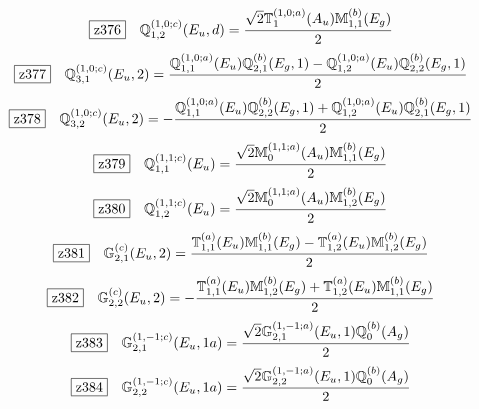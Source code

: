 \documentclass[fleqn,10pt,landscape]{jsarticle}
\begin{document}
\begin{dmath*}
\hspace*{3mm}\fbox{z376}\quad \mathbb{Q}_{1,2}^{(1,0;c)}(E_{u},d)=\frac{\sqrt{2} \mathbb{T}_{1}^{(1,0;a)}(A_{u}) \mathbb{M}_{1,1}^{(b)}(E_{g})}{2}
\end{dmath*}
\begin{dmath*}
\hspace*{3mm}\fbox{z377}\quad \mathbb{Q}_{3,1}^{(1,0;c)}(E_{u},2)=\frac{\mathbb{Q}_{1,1}^{(1,0;a)}(E_{u}) \mathbb{Q}_{2,1}^{(b)}(E_{g},1) - \mathbb{Q}_{1,2}^{(1,0;a)}(E_{u}) \mathbb{Q}_{2,2}^{(b)}(E_{g},1)}{2}
\end{dmath*}
\begin{dmath*}
\hspace*{3mm}\fbox{z378}\quad \mathbb{Q}_{3,2}^{(1,0;c)}(E_{u},2)=- \frac{\mathbb{Q}_{1,1}^{(1,0;a)}(E_{u}) \mathbb{Q}_{2,2}^{(b)}(E_{g},1) + \mathbb{Q}_{1,2}^{(1,0;a)}(E_{u}) \mathbb{Q}_{2,1}^{(b)}(E_{g},1)}{2}
\end{dmath*}
\begin{dmath*}
\hspace*{3mm}\fbox{z379}\quad \mathbb{Q}_{1,1}^{(1,1;c)}(E_{u})=\frac{\sqrt{2} \mathbb{M}_{0}^{(1,1;a)}(A_{u}) \mathbb{M}_{1,1}^{(b)}(E_{g})}{2}
\end{dmath*}
\begin{dmath*}
\hspace*{3mm}\fbox{z380}\quad \mathbb{Q}_{1,2}^{(1,1;c)}(E_{u})=\frac{\sqrt{2} \mathbb{M}_{0}^{(1,1;a)}(A_{u}) \mathbb{M}_{1,2}^{(b)}(E_{g})}{2}
\end{dmath*}
\begin{dmath*}
\hspace*{3mm}\fbox{z381}\quad \mathbb{G}_{2,1}^{(c)}(E_{u},2)=\frac{\mathbb{T}_{1,1}^{(a)}(E_{u}) \mathbb{M}_{1,1}^{(b)}(E_{g}) - \mathbb{T}_{1,2}^{(a)}(E_{u}) \mathbb{M}_{1,2}^{(b)}(E_{g})}{2}
\end{dmath*}
\begin{dmath*}
\hspace*{3mm}\fbox{z382}\quad \mathbb{G}_{2,2}^{(c)}(E_{u},2)=- \frac{\mathbb{T}_{1,1}^{(a)}(E_{u}) \mathbb{M}_{1,2}^{(b)}(E_{g}) + \mathbb{T}_{1,2}^{(a)}(E_{u}) \mathbb{M}_{1,1}^{(b)}(E_{g})}{2}
\end{dmath*}
\begin{dmath*}
\hspace*{3mm}\fbox{z383}\quad \mathbb{G}_{2,1}^{(1,-1;c)}(E_{u},1a)=\frac{\sqrt{2} \mathbb{G}_{2,1}^{(1,-1;a)}(E_{u},1) \mathbb{Q}_{0}^{(b)}(A_{g})}{2}
\end{dmath*}
\begin{dmath*}
\hspace*{3mm}\fbox{z384}\quad \mathbb{G}_{2,2}^{(1,-1;c)}(E_{u},1a)=\frac{\sqrt{2} \mathbb{G}_{2,2}^{(1,-1;a)}(E_{u},1) \mathbb{Q}_{0}^{(b)}(A_{g})}{2}
\end{dmath*}
\end{document}
